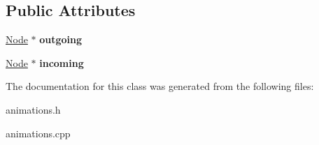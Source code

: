 \subsection*{Public Attributes}
\begin{DoxyCompactItemize}
\item 
\hypertarget{classg2c_1_1_transition_a18fc15af3ff46f351799186abe263a70}{
\hyperlink{classg2c_1_1_node}{Node} $\ast$ {\bfseries outgoing}}
\label{classg2c_1_1_transition_a18fc15af3ff46f351799186abe263a70}

\item 
\hypertarget{classg2c_1_1_transition_aae574b923cdbb5a6d969ea79d74dee56}{
\hyperlink{classg2c_1_1_node}{Node} $\ast$ {\bfseries incoming}}
\label{classg2c_1_1_transition_aae574b923cdbb5a6d969ea79d74dee56}

\end{DoxyCompactItemize}


The documentation for this class was generated from the following files:\begin{DoxyCompactItemize}
\item 
animations.h\item 
animations.cpp\end{DoxyCompactItemize}
